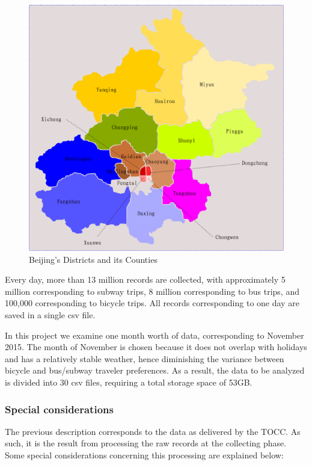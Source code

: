 \documentclass{article}
\begin{document}
\begin{figure}
  \centering
  \includegraphics[width=.8\linewidth]{./images/beijing_18areas.png}
  \caption{Beijing's Districts and its Counties}
  \label{fig:data/18areas}
\end{figure}

Every day, more than 13 million records are collected, with approximately 5 million corresponding to subway trips, 8 million corresponding to bus trips, and 100,000 corresponding to bicycle trips. All records corresponding to one day are saved in a single csv file. 

In this project we examine one month worth of data, corresponding to November 2015. The month of November is chosen because it does not overlap with holidays and has a relatively stable weather, hence diminishing the variance between bicycle and bus/subway traveler preferences. As a result, the data to be analyzed is divided into 30 csv files, requiring a total storage space of 53GB.

\subsubsection{Special considerations}
The previous description corresponds to the data as delivered by the TOCC. As such, it is the result from processing the raw records at the collecting phase. Some special considerations concerning this processing are explained below:
\end{document}
